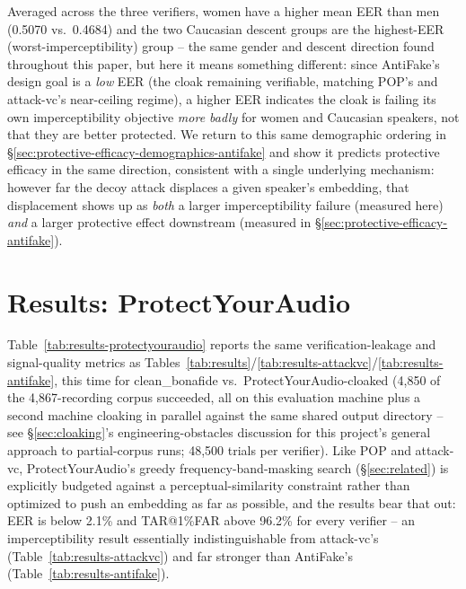 \documentclass[11pt]{article}
\begin{document}
Averaged across the three verifiers, women have a higher mean EER than
men (0.5070 vs.\ 0.4684) and the two Caucasian descent groups are the
highest-EER (worst-imperceptibility) group -- the same gender and
descent direction found throughout this paper, but here it means
something different: since AntiFake's design goal is a \emph{low} EER
(the cloak remaining verifiable, matching POP's and attack-vc's
near-ceiling regime), a higher EER indicates the cloak is failing its
own imperceptibility objective \emph{more badly} for women and
Caucasian speakers, not that they are better protected. We return to
this same demographic ordering in
\S\ref{sec:protective-efficacy-demographics-antifake} and show it
predicts protective efficacy in the same direction, consistent with a
single underlying mechanism: however far the decoy attack displaces a
given speaker's embedding, that displacement shows up as \emph{both} a
larger imperceptibility failure (measured here) \emph{and} a larger
protective effect downstream (measured in
\S\ref{sec:protective-efficacy-antifake}).

\section{Results: ProtectYourAudio}
\label{sec:results-protectyouraudio}

Table~\ref{tab:results-protectyouraudio} reports the same
verification-leakage and signal-quality metrics as
Tables~\ref{tab:results}/\ref{tab:results-attackvc}/\ref{tab:results-antifake},
this time for clean\_bonafide vs.\ ProtectYourAudio-cloaked (4,850 of
the 4,867-recording corpus succeeded, all on this evaluation machine
plus a second machine cloaking in parallel against the same shared
output directory -- see \S\ref{sec:cloaking}'s engineering-obstacles
discussion for this project's general approach to partial-corpus
runs; 48,500 trials per verifier). Like POP and attack-vc,
ProtectYourAudio's greedy frequency-band-masking search
(\S\ref{sec:related}) is explicitly budgeted against a
perceptual-similarity constraint rather than optimized to push an
embedding as far as possible, and the results bear that out: EER is
below 2.1\% and TAR@1\%FAR above 96.2\% for every verifier -- an
imperceptibility result essentially indistinguishable from attack-vc's
(Table~\ref{tab:results-attackvc}) and far stronger than AntiFake's
(Table~\ref{tab:results-antifake}).
\end{document}
